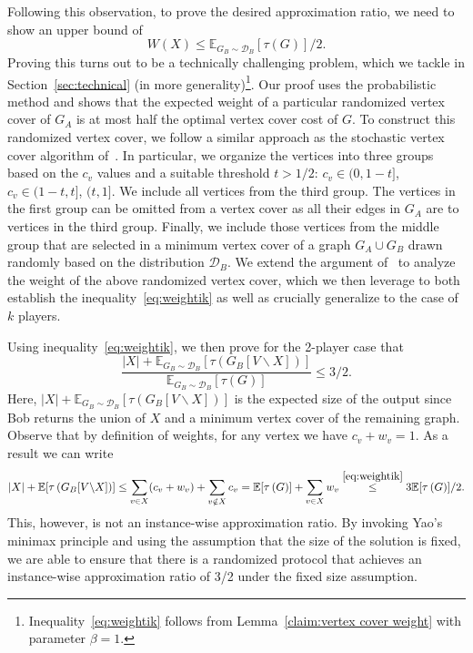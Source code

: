 \documentclass[11pt]{article}
\newcommand{\E}[0]{\ensuremath{\mathbb{E}}}
\newcommand{\mvc}[1]{\tau\left(#1 \right)}
\begin{document}
Following this observation, to prove the desired approximation ratio, we need to show an upper bound of 
\begin{equation}\label{eq:weightik}
    W(X)\leq \E_{G_B \sim \mathcal{D}_B}[\mvc{G}]/2. 
\end{equation} 
Proving this turns out to be a technically challenging problem, which
we tackle in Section~\ref{sec:technical} (in more generality)\footnote{Inequality~\ref{eq:weightik}  follows from Lemma~\ref{claim:vertex cover weight} with parameter $\beta=1$.}.  Our proof uses the
probabilistic method and shows that the expected weight of a
particular randomized vertex cover of $G_A$ is at most half the
optimal vertex cover cost of $G$.  To construct this randomized vertex
cover, we follow a similar approach as the stochastic vertex cover
algorithm of~\cite{DBLP:conf/stoc/DerakhshanDH23}.  In particular, we organize the vertices into
three groups based on the $c_v$ values and a suitable threshold $t
> 1/2$: $c_v \in (0, 1 - t]$, $c_v \in (1 - t, t]$, $(t,
    1]$.  We include all vertices from the third group.
    The vertices in the first group can be omitted from a vertex
      cover as all their edges in $G_A$ are to vertices in the third group. Finally, we include
      those vertices from the middle group that are selected in a
      minimum vertex cover of a graph $G_A \cup G_B$ drawn randomly
      based on the distribution $\mathcal{D}_B$.
We extend the
      argument of~\cite{DBLP:conf/stoc/DerakhshanDH23} to analyze the weight of the above
      randomized vertex cover, which we then leverage to both
      establish the inequality~\ref{eq:weightik} as well as crucially generalize
      to the case of $k$ players.

Using inequality~\ref{eq:weightik}, we then prove for the 2-player case that\begin{equation}
     \frac{|X|+ \E_{G_B \sim \mathcal{D}_B}[\mvc{G_B[V \backslash X]}]}{\E_{G_B \sim \mathcal{D}_B}[\mvc{G}]} \leq 3/2. \end{equation} 
Here, $|X|+ \E_{G_B \sim \mathcal{D}_B}[\mvc{G_B[V \backslash X]}]$ is the expected size of the output since Bob returns the union of $X$ and a minimum vertex cover of the remaining graph. Observe that by definition of weights, for any vertex we have $c_v+w_v=1$.  As a result we can write 
\begin{align*}
    |X|+ \E[\mvc{G_B[V \backslash X]}] \leq \sum_{v\in X} (c_v+ w_v) + \sum_{v\notin X} c_v = \E[\mvc{G}] + \sum_{v\in X} w_v  \stackrel{\eqref{eq:weightik}}{\leq} 3\E[\mvc{G}]/2.  
\end{align*}
This, however, is not an instance-wise approximation ratio.  By
invoking Yao's minimax principle and using the assumption that the
size of the solution is fixed, we are able to ensure that there is a
randomized protocol that achieves an instance-wise approximation ratio
of 3/2 under the fixed size assumption.
\end{document}
